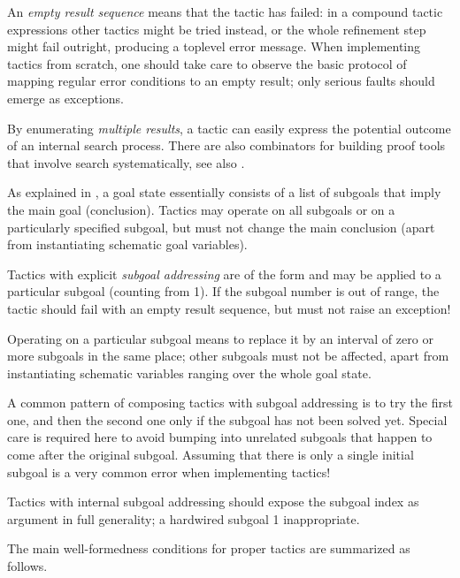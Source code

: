 \begin{isabellebody}
\begin{isamarkuptext}
  An \emph{empty result sequence} means that the tactic has failed: in
  a compound tactic expressions other tactics might be tried instead,
  or the whole refinement step might fail outright, producing a
  toplevel error message.  When implementing tactics from scratch, one
  should take care to observe the basic protocol of mapping regular
  error conditions to an empty result; only serious faults should
  emerge as exceptions.

  By enumerating \emph{multiple results}, a tactic can easily express
  the potential outcome of an internal search process.  There are also
  combinators for building proof tools that involve search
  systematically, see also .

  \medskip As explained in , a goal state
  essentially consists of a list of subgoals that imply the main goal
  (conclusion).  Tactics may operate on all subgoals or on a
  particularly specified subgoal, but must not change the main
  conclusion (apart from instantiating schematic goal variables).

  Tactics with explicit \emph{subgoal addressing} are of the form
   and may be applied to a particular subgoal
  (counting from 1).  If the subgoal number is out of range, the
  tactic should fail with an empty result sequence, but must not raise
  an exception!

  Operating on a particular subgoal means to replace it by an interval
  of zero or more subgoals in the same place; other subgoals must not
  be affected, apart from instantiating schematic variables ranging
  over the whole goal state.

  A common pattern of composing tactics with subgoal addressing is to
  try the first one, and then the second one only if the subgoal has
  not been solved yet.  Special care is required here to avoid bumping
  into unrelated subgoals that happen to come after the original
  subgoal.  Assuming that there is only a single initial subgoal is a
  very common error when implementing tactics!

  Tactics with internal subgoal addressing should expose the subgoal
  index as  argument in full generality; a hardwired
  subgoal 1 inappropriate.
  
  \medskip The main well-formedness conditions for proper tactics are
  summarized as follows.

  \begin{itemize}


\end{itemize}
\end{isamarkuptext}
\end{isabellebody}
